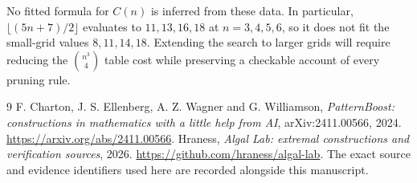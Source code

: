 \documentclass[11pt,a4paper]{article}
\begin{document}
No fitted formula for $C(n)$ is inferred from these data. In particular, $\lfloor(5n+7)/2\rfloor$ evaluates to $11,13,16,18$ at $n=3,4,5,6$, so it does not fit the small-grid values $8,11,14,18$. Extending the search to larger grids will require reducing the $\binom{n^3}{4}$ table cost while preserving a checkable account of every pruning rule.

\begin{thebibliography}{9}
 F. Charton, J. S. Ellenberg, A. Z. Wagner and G. Williamson, \emph{PatternBoost: constructions in mathematics with a little help from AI}, arXiv:2411.00566, 2024. \url{https://arxiv.org/abs/2411.00566}.
 Hraness, \emph{Algal Lab: extremal constructions and verification sources}, 2026. \url{https://github.com/hraness/algal-lab}. The exact source and evidence identifiers used here are recorded alongside this manuscript.
\end{thebibliography}
\end{document}
